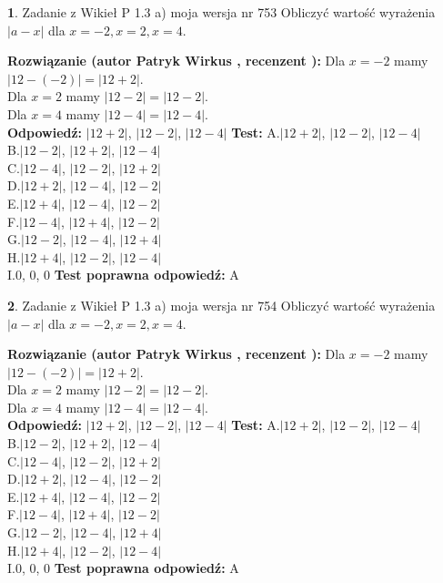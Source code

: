 \documentclass[12pt, a4paper]{article}
\theoremstyle{definition} %
\newtheorem{zad}{}
\newcommand{\zadStart}[1]{\begin{zad}#1\newline}
\newcommand{\zadStop}{\end{zad}}
\newcommand{\rozwStart}[2]{\noindent \textbf{Rozwiązanie (autor #1 , recenzent #2): }\newline}
\newcommand{\rozwStop}{\newline}
\newcommand{\odpStart}{\noindent \textbf{Odpowiedź:}\newline}
\newcommand{\odpStop}{\newline}
\newcommand{\testStart}{\noindent \textbf{Test:}\newline}
\newcommand{\testStop}{\newline}
\newcommand{\kluczStart}{\noindent \textbf{Test poprawna odpowiedź:}\newline}
\newcommand{\kluczStop}{\newline}
\begin{document}
\zadStart{Zadanie z Wikieł P 1.3 a) moja wersja nr 753}
Obliczyć wartość wyrażenia $|a - x|$ dla $x=-2,x=2,x=4$.
\zadStop
\rozwStart{Patryk Wirkus}{}
Dla $x = -2$ mamy $|12 - (-2)| = |12 + 2|$.\\
Dla $x = 2$ mamy $|12 - 2| = |12 - 2|$.\\
Dla $x = 4$ mamy $|12 - 4| = |12 - 4|$.\\
\rozwStop
\odpStart
$|12 + 2|$, $|12 - 2|$, $|12 - 4|$
\odpStop
\testStart
A.$|12 + 2|$, $|12 - 2|$, $|12 - 4|$\\
B.$|12 - 2|$, $|12 + 2|$, $|12 - 4|$\\
C.$|12 - 4|$, $|12 - 2|$, $|12 + 2|$\\
D.$|12 + 2|$, $|12 - 4|$, $|12 - 2|$\\
E.$|12 + 4|$, $|12 - 4|$, $|12 - 2|$\\
F.$|12 - 4|$, $|12 + 4|$, $|12 - 2|$\\
G.$|12 - 2|$, $|12 - 4|$, $|12 + 4|$\\
H.$|12 + 4|$, $|12 - 2|$, $|12 - 4|$\\
I.$0$, $0$, $0$
\testStop
\kluczStart
A
\kluczStop



\zadStart{Zadanie z Wikieł P 1.3 a) moja wersja nr 754}
Obliczyć wartość wyrażenia $|a - x|$ dla $x=-2,x=2,x=4$.
\zadStop
\rozwStart{Patryk Wirkus}{}
Dla $x = -2$ mamy $|12 - (-2)| = |12 + 2|$.\\
Dla $x = 2$ mamy $|12 - 2| = |12 - 2|$.\\
Dla $x = 4$ mamy $|12 - 4| = |12 - 4|$.\\
\rozwStop
\odpStart
$|12 + 2|$, $|12 - 2|$, $|12 - 4|$
\odpStop
\testStart
A.$|12 + 2|$, $|12 - 2|$, $|12 - 4|$\\
B.$|12 - 2|$, $|12 + 2|$, $|12 - 4|$\\
C.$|12 - 4|$, $|12 - 2|$, $|12 + 2|$\\
D.$|12 + 2|$, $|12 - 4|$, $|12 - 2|$\\
E.$|12 + 4|$, $|12 - 4|$, $|12 - 2|$\\
F.$|12 - 4|$, $|12 + 4|$, $|12 - 2|$\\
G.$|12 - 2|$, $|12 - 4|$, $|12 + 4|$\\
H.$|12 + 4|$, $|12 - 2|$, $|12 - 4|$\\
I.$0$, $0$, $0$
\testStop
\kluczStart
A
\kluczStop
\end{document}
